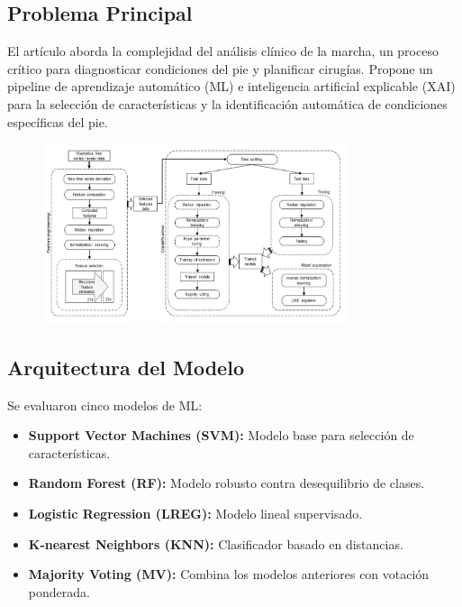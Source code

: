 \documentclass{report}
\begin{document}
\subsection{Problema Principal}
El artículo aborda la complejidad del análisis clínico de la marcha, un proceso crítico para diagnosticar condiciones del pie y planificar cirugías. Propone un pipeline de aprendizaje automático (ML) e inteligencia artificial explicable (XAI) para la selección de características y la identificación automática de condiciones específicas del pie.


\begin{figure}[H] 
    \centering
    \includegraphics[width=0.8\textwidth]{Images/Erkam2024_1.jpg}
\end{figure}

\subsection{Arquitectura del Modelo}
Se evaluaron cinco modelos de ML:
\begin{itemize}
    \item \textbf{Support Vector Machines (SVM):} Modelo base para selección de características.
    \item \textbf{Random Forest (RF):} Modelo robusto contra desequilibrio de clases.
    \item \textbf{Logistic Regression (LREG):} Modelo lineal supervisado.
    \item \textbf{K-nearest Neighbors (KNN):} Clasificador basado en distancias.
    \item \textbf{Majority Voting (MV):} Combina los modelos anteriores con votación ponderada.
\end{itemize}
\end{document}

